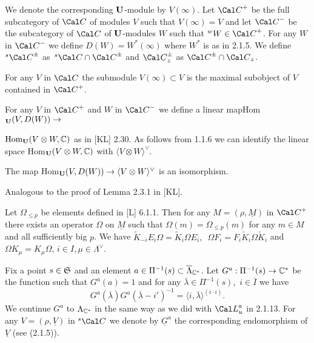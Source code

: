 We denote the corresponding ${\bold U}$-module by  $V(\infty)$.  Let  ${\Cal
C}^+$
be the full subcategory of ${\Cal C}$  of modules $V$  such that  $V(\infty)
= V$  and  let  ${\Cal C}^-$  be the subcategory of  ${\Cal C}$  of ${\bold
U}$-modules
$W$  such that  ${}^wW \in {\Cal C}^+$.  For any $W$ in ${\Cal C}^-$  we define
$D(W) = W^*(\infty)$  where  $W^*$  is as in 2.1.5. We define ${}^s{\Cal
C}^\pm$
as\ ${}^s{\Cal C} \cap {\Cal C}^\pm$  and  ${\Cal C}^\pm_z$  as
${\Cal C}^\pm \cap {\Cal C}_z$.

  For any ${V}$  in ${\Cal C}$  the submodule
$V(\infty) \subset {V}$  is the maximal subobject of ${V}$
contained in ${\Cal C}^+$.
\enddemo


  For any  $V$ in ${\Cal C}^+$  and  $W$  in ${\Cal C}^-$
we define a linear map\quad   Hom$_{\bold U}(V,D(W)) \to$

\noindent
$\text{Hom}_{\bold U}(V \otimes W, {\Bbb C})$
as in [KL] 2.30.  As follows from 1.1.6 we can identify the linear space
Hom$_{\bold U}(V \otimes W, {\Bbb C})$  with  $\langle V \otimes
W\rangle^\vee$.

  The map Hom$_{\bold U}(V,D(W)) \to
\langle V \otimes W\rangle^\vee$  is an isomorphism.
\endproclaim

  Analogous to the proof of Lemma 2.3.1 in [KL].
\enddemo

  Let  $\Omega_{\le p}$  be elements defined in [L] 6.1.1.
Then for any  $M = (\rho, \underline{M})$ in ${\Cal C}^+$  there exists an
operator $\Omega$
on $\underline{M}$  such that  $\Omega(m) = \Omega_{\le p}(m)$  for any
$m \in M$  and all sufficiently big $p$.  We have
$\widetilde{K}_{-i} E_i\Omega = \widetilde{K}_i\Omega E_i,$\
$\Omega F_i = F_i \widetilde{K}_i \Omega \widetilde{K}_i$  and
$\Omega K_\mu = K_\mu\Omega$, $i \in I, \mu \in \Lambda^\vee$.


   Fix a point  $s \in {\frak S}$  and an element
$a \in \Pi^{-1}(s)
\subset  \overline{\Lambda}_{{\Bbb C}^*}$.   Let $G^a: \Pi^{-1}(s) \to
{\Bbb C}^*$    be the function such that  $G^a(a) = 1$  and for any
$\overline{\lambda} \in \Pi^{-1}(s)$,\ $i \in \overline{I}$  we have
$$
G^a(\overline{\lambda}) G^a(\overline{\lambda} - i')^{-1} =
\langle i,\overline{\lambda}\rangle^{(i\cdot i)} .
$$
We continue  $G^a$  to  $\Lambda_{{\Bbb C}^*}$  in the same way as we did
with  ${\Cal L}^a_u$  in 2.1.13.
For any  $V = (\rho,\underline{V})$  in ${}^s{\Cal C}$  we denote by
$\underline{G}^a$  the corresponding endomorphism of  $\underline{V}$ (see
(2.1.5)).

